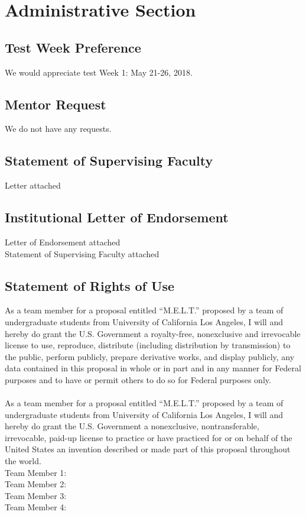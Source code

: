\documentclass{article}
\begin{document}
\section{Administrative Section}
\subsection{Test Week Preference}
We would appreciate test Week 1: May 21-26, 2018. 
\subsection{Mentor Request}
We do not have any requests.

\subsection{Statement of Supervising Faculty}
Letter attached
\subsection{Institutional Letter of Endorsement}
\noindent
Letter of Endorsement attached \\
Statement of Supervising Faculty attached \\

\subsection{Statement of Rights of Use}
\noindent
As a team member for a proposal entitled “M.E.L.T.” proposed by a team of undergraduate students from University of California Los Angeles, I will and hereby do grant the U.S. Government a royalty-free, nonexclusive and irrevocable license to use, reproduce, distribute (including distribution by transmission) to the public, perform publicly, prepare derivative works, and display publicly, any data contained in this proposal in whole or in part and in any manner for Federal purposes and to have or permit others to do so for Federal purposes only. \\
\\
As a team member for a proposal entitled “M.E.L.T.” proposed by a team of undergraduate students from University of California Los Angeles, I will and hereby do grant the U.S. Government a nonexclusive, nontransferable, irrevocable, paid-up license to practice or have practiced for or on behalf of the United States an invention described or made part of this proposal throughout the world. \\
\break
\noindent
Team Member 1: \hrulefill \\
\break
Team Member 2: \hrulefill \\
\break
Team Member 3: \hrulefill \\
\break
Team Member 4: \hrulefill \\
\end{document}
